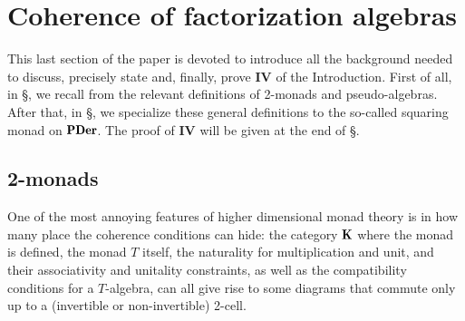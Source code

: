 \section{Coherence of factorization algebras}
\label{sec:thmB}

This last section of the paper is devoted to introduce all the background needed to discuss, precisely state and, finally, prove \athm \textbf{IV} of the Introduction. First of all, in §, we recall from \cite[§\textbf{1}]{lack2002codescent} the relevant definitions of 2-monads and pseudo-algebras. After that, in §, we specialize these general definitions to the so-called squaring monad on $\PDer$. The proof of \athm\@\textbf{IV} will be given at the end of §.
 
\subsection{2-monads}\label{monads_subs}
One of the most annoying features of higher dimensional monad theory is in how many place the coherence conditions can hide: the category $\cate{K}$ where the monad is defined, the monad $T$ itself, the naturality for multiplication and unit, and their associativity and unitality constraints, as well as the compatibility conditions for a $T$\hyp{}algebra, can all give rise to some diagrams that commute only up to a (invertible or non\hyp{}invertible) 2-cell.

